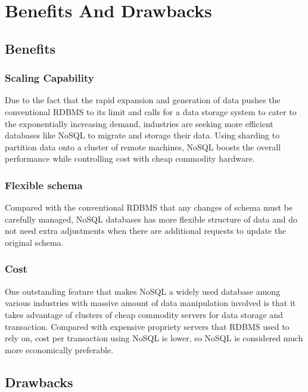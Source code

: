 \[\]
\section{Benefits And Drawbacks}

\subsection{Benefits}

\subsubsection{Scaling Capability}\mbox{}


\noindent Due to the fact that the rapid expansion and generation of data pushes the conventional RDBMS to its limit and calls for a data storage system to cater to the exponentially increasing demand,  industries are seeking more efficient databases like NoSQL to migrate and storage their data.
Using sharding to partition data onto a cluster of remote machines, NoSQL boosts the overall performance while controlling cost with cheap commodity hardware.


\subsubsection{Flexible schema} \mbox{}

\noindent Compared with the conventional RDBMS that any changes of schema must be carefully managed, NoSQL databases has more flexible structure of data and do not need extra adjustments when there are additional requests to update the original schema. 


\subsubsection{Cost}\mbox{}

\noindent One outstanding feature that makes NoSQL a widely used database among various industries with massive amount of data manipulation involved is that it takes advantage of clusters of cheap commodity servers for data storage and transaction.
Compared with expensive propriety servers that RDBMS used to rely on, cost per transaction using NoSQL is lower, so NoSQL is considered much more economically preferable.  


\subsection{Drawbacks}

